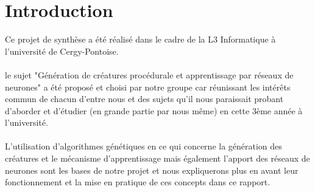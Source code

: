 \section{Introduction}

Ce projet de synthèse a été réalisé dans le cadre de la L3 Informatique à l'université de Cergy-Pontoise.\\\\
le sujet "Génération de créatures procédurale et apprentissage par réseaux de neurones" a été proposé et choisi par notre groupe car réunissant les intérêts commun de chacun d'entre nous et des sujets qu'il nous paraissait probant d'aborder et d'étudier (en grande partie par nous même) en cette 3ème année à l'université.\\\\
L'utilisation d'algorithmes génétiques en ce qui concerne la génération des créatures et le mécanisme d'apprentissage mais également l'apport des réseaux de neurones sont les bases de notre projet et nous expliquerons plus en avant leur fonctionnement et la mise en pratique de ces concepts dans ce rapport.


